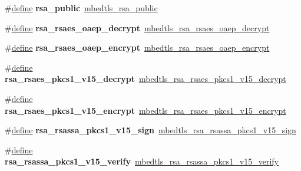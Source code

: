 \begin{DoxyCompactItemize}
\mbox{\label{compat-1_83_8h_afd078f76c12b53940e6cd94a897dbeeb}} 
\#\hyperlink{structdefine}{define} {\bfseries rsa\+\_\+public}~\hyperlink{rsa_8h_a9db0f76aff9a6ce179b6fbe329bf5569}{mbedtls\+\_\+rsa\+\_\+public}
\item 
\mbox{\label{compat-1_83_8h_a284331182cd96ce92212946104894a89}} 
\#\hyperlink{structdefine}{define} {\bfseries rsa\+\_\+rsaes\+\_\+oaep\+\_\+decrypt}~\hyperlink{rsa_8h_afe0ea987f1d1627cc86137e5b1595da8}{mbedtls\+\_\+rsa\+\_\+rsaes\+\_\+oaep\+\_\+decrypt}
\item 
\mbox{\label{compat-1_83_8h_a31f5fef152b86b6ef76df14887302305}} 
\#\hyperlink{structdefine}{define} {\bfseries rsa\+\_\+rsaes\+\_\+oaep\+\_\+encrypt}~\hyperlink{rsa_8h_ad2dda710a8a517d02220632bcf0eda13}{mbedtls\+\_\+rsa\+\_\+rsaes\+\_\+oaep\+\_\+encrypt}
\item 
\mbox{\label{compat-1_83_8h_a15becf817b180ae07d9ed5a567c0f8a6}} 
\#\hyperlink{structdefine}{define} {\bfseries rsa\+\_\+rsaes\+\_\+pkcs1\+\_\+v15\+\_\+decrypt}~\hyperlink{rsa_8h_a57b7b96e1dbb900bb42cc2e1704e051b}{mbedtls\+\_\+rsa\+\_\+rsaes\+\_\+pkcs1\+\_\+v15\+\_\+decrypt}
\item 
\mbox{\label{compat-1_83_8h_a04571ed789db2f0bacf367937bbd1d64}} 
\#\hyperlink{structdefine}{define} {\bfseries rsa\+\_\+rsaes\+\_\+pkcs1\+\_\+v15\+\_\+encrypt}~\hyperlink{rsa_8h_a5037e3e29277b9d0dc3a4ef84b251f4e}{mbedtls\+\_\+rsa\+\_\+rsaes\+\_\+pkcs1\+\_\+v15\+\_\+encrypt}
\item 
\mbox{\label{compat-1_83_8h_aed845db7cb7b7929829922a8d54920f5}} 
\#\hyperlink{structdefine}{define} {\bfseries rsa\+\_\+rsassa\+\_\+pkcs1\+\_\+v15\+\_\+sign}~\hyperlink{rsa_8h_aed5ff7848640b50f4a829a43f7135de4}{mbedtls\+\_\+rsa\+\_\+rsassa\+\_\+pkcs1\+\_\+v15\+\_\+sign}
\item 
\mbox{\label{compat-1_83_8h_ac2c73232441b5a16a589768eb319ca7c}} 
\#\hyperlink{structdefine}{define} {\bfseries rsa\+\_\+rsassa\+\_\+pkcs1\+\_\+v15\+\_\+verify}~\hyperlink{rsa_8h_a27b1f6721bfe13049ebda58b0684f446}{mbedtls\+\_\+rsa\+\_\+rsassa\+\_\+pkcs1\+\_\+v15\+\_\+verify}
\item 
\mbox{\label{compat-1_83_8h_a3cb38b10df94be4e06900c7f439ebf09}} 

\end{DoxyCompactItemize}
